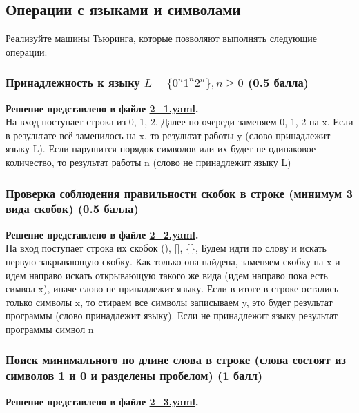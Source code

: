 \documentclass[a4paper,12pt]{article}
\begin{document}
\subsection{Операции с языками и символами}

Реализуйте машины Тьюринга, которые позволяют выполнять следующие операции:

\subsubsection{Принадлежность к языку $L = \{ 0^n1^n2^n \}, n \ge 0$ (0.5 балла)}

\textbf{Решение представлено в файле \href{https://github.com/NRU-MPEI-IMAI/tm-and-qc-NovichikhinIV/blob/main/yaml/2_1.yaml}{2\_1.yaml}.} \\

На вход поступает строка из 0, 1, 2. Далее по очереди заменяем 0, 1, 2 на x. Если в результате всё заменилось на x, то результат работы y (слово принадлежит языку L). Если нарушится порядок символов или их будет не одинаковое количество, то результат работы n (слово не принадлежит языку L)


\subsubsection{Проверка соблюдения правильности скобок в строке (минимум 3 вида скобок) (0.5 балла)}

\textbf{Решение представлено в файле \href{https://github.com/NRU-MPEI-IMAI/tm-and-qc-NovichikhinIV/blob/main/yaml/2_2.yaml}{2\_2.yaml}.} \\

На вход поступает строка их скобок (), [], \{\}, Будем идти по слову и искать первую закрывающую скобку. Как только она найдена, заменяем скобку на x и идем направо искать открывающую такого же вида (идем направо пока есть символ x), иначе слово не принадлежит языку. Если в итоге в строке остались только символы x, то стираем все символы записываем y, это будет результат программы (слово принадлежит языку). Если не принадлежит языку результат программы символ n

\subsubsection{Поиск минимального по длине слова в строке (слова состоят из символов 1 и 0 и разделены пробелом) (1 балл)}

\textbf{Решение представлено в файле \href{https://github.com/NRU-MPEI-IMAI/tm-and-qc-NovichikhinIV/blob/main/yaml/2_3.yaml}{2\_3.yaml}.} \\
\end{document}
